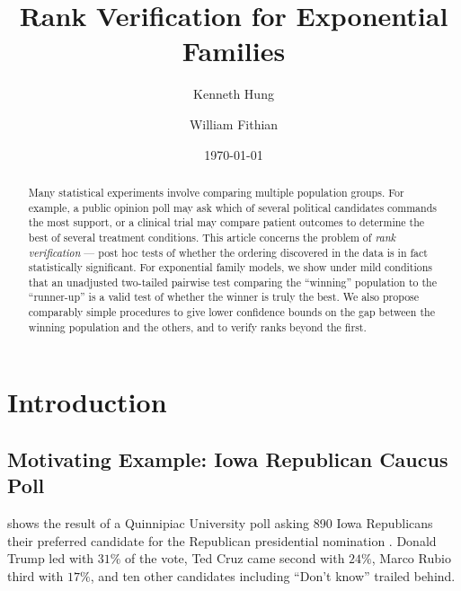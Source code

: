 \documentclass[11pt]{article}
\theoremstyle{definition}
\theoremstyle{custom}
\begin{document}
\title{Rank Verification for Exponential Families}
\author{Kenneth Hung \and William Fithian}
\date{\today}
\maketitle

\begin{abstract}
Many statistical experiments involve comparing multiple population groups. For example, a public opinion poll may ask which of several political candidates commands the most support, or a clinical trial may compare patient outcomes to determine the best of several treatment conditions. This article concerns the problem of {\em rank verification} --- post hoc tests of whether the ordering discovered in the data is in fact statistically significant. For exponential family models, we show under mild conditions that an unadjusted two-tailed pairwise test comparing the ``winning'' population to the ``runner-up'' is a valid test of whether the winner is truly the best. We also propose comparably simple procedures to give lower confidence bounds on the gap between the winning population and the others, and to verify ranks beyond the first.
\end{abstract}

\section{Introduction}
\label{sec:intro}

\subsection{Motivating Example: Iowa Republican Caucus Poll}
\label{sec:iowa}

 shows the result of a Quinnipiac University poll asking 890 Iowa Republicans their preferred candidate for the Republican presidential nomination \citep{quinnipiac}. Donald Trump led with $31\%$ of the vote, Ted Cruz came second with $24\%$, Marco Rubio third with $17\%$, and ten other candidates including ``Don't know'' trailed behind. 
\end{document}
